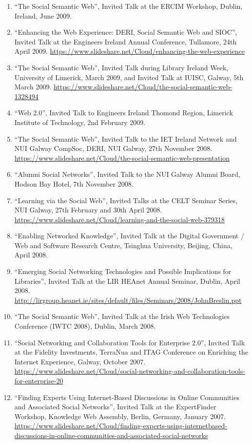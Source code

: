 \documentclass[10pt,a4paper]{res} %
\begin{document}
\begin{resume}
\begin{enumerate}
\item ``The Social Semantic Web'', Invited Talk at the ERCIM Workshop, Dublin, Ireland, June 2009. %
\item ``Enhancing the Web Experience: DERI, Social Semantic Web and SIOC'', Invited Talk at the Engineers Ireland Annual Conference, Tullamore, 24th April 2009. \url{https://www.slideshare.net/Cloud/enhancing-the-web-experience}
\item ``The Social Semantic Web'', Invited Talk during Library Ireland Week, University of Limerick, March 2009, and Invited Talk at IUISC, Galway, 5th March 2009. \url{https://www.slideshare.net/Cloud/the-social-semantic-web-1328494}
\item ``Web 2.0'', Invited Talk to Engineers Ireland Thomond Region, Limerick Institute of Technology, 2nd February 2009. %
\item ``The Social Semantic Web'', Invited Talk to the IET Ireland Network and NUI Galway CompSoc, DERI, NUI Galway, 27th November 2008. \url{https://www.slideshare.net/Cloud/the-social-semantic-web-presentation}
\item ``Alumni Social Networks'', Invited Talk to the NUI Galway Alumni Board, Hodson Bay Hotel, 7th November 2008.
\item ``Learning via the Social Web'', Invited Talks at the CELT Seminar Series, NUI Galway, 27th February and 30th April 2008. \url{https://www.slideshare.net/Cloud/learning-and-the-social-web-379318}
\item ``Enabling Networked Knowledge'', Invited Talk at the Digital Government / Web and Software Research Centre, Tsinghua University, Beijing, China, April 2008. %
\item ``Emerging Social Networking Technologies and Possible Implications for Libraries'', Invited Talk at the LIR HEAnet Annual Seminar, Dublin, April 2008. \url{http://lirgroup.heanet.ie/sites/default/files/Seminars/2008/JohnBreslin.ppt}
\item ``The Social Semantic Web'', Invited Talk at the Irish Web Technologies Conference (IWTC 2008), Dublin, March 2008. %
\item ``Social Networking and Collaboration Tools for Enterprise 2.0'', Invited Talk at the Fidelity Investments, TerraNua and ITAG Conference on Enriching the Internet Experience, Galway, October 2007. \url{https://www.slideshare.net/Cloud/social-networking-and-collaboration-tools-for-enterprise-20}
\item ``Finding Experts Using Internet-Based Discussions in Online Communities and Associated Social Networks'', Invited Talk at the ExpertFinder Workshop, Knowledge Web Assembly, Berlin, Germany, January 2007. \url{https://www.slideshare.net/Cloud/finding-experts-using-internetbased-discussions-in-online-communities-and-associated-social-networks}

\end{enumerate}
\end{resume}
\end{document}
